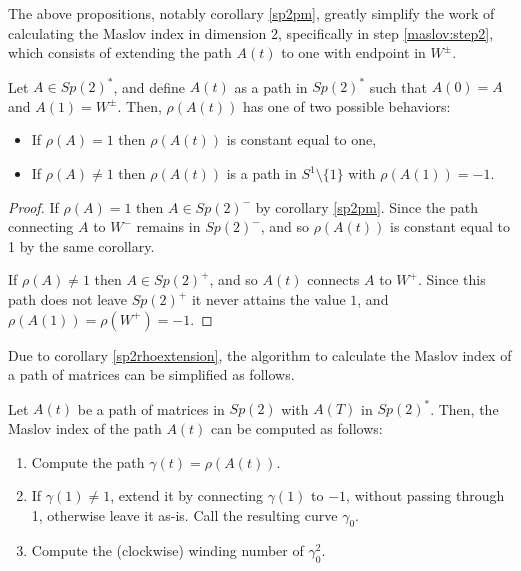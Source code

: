 The above propositions, notably corollary \ref{sp2pm}, greatly simplify the work of calculating the Maslov index in dimension 2, specifically in step \ref{maslov:step2}, which consists of extending the path $A(t)$ to one with endpoint in $W^\pm$.

\begin{corollary}\label{sp2rhoextension}
Let $A \in Sp(2)^*$, and define $A(t)$ as a path in $Sp(2)^*$ such that $A(0) = A$ and $A(1) = W^\pm$. Then, $\rho(A(t))$ has one of two possible behaviors:
\begin{itemize}
\item If $\rho(A) = 1$ then $\rho(A(t))$ is constant equal to one,
\item If $\rho(A) \neq 1$ then $\rho(A(t))$ is a path in $S^1 \setminus \{1\}$ with $\rho(A(1)) = -1$.
\end{itemize}
\end{corollary}

\begin{proof}
If $\rho(A) = 1$ then $A \in Sp(2)^-$ by corollary \ref{sp2pm}. Since the path connecting $A$ to $W^-$ remains in $Sp(2)^-$, and so $\rho(A(t))$ is constant equal to 1 by the same corollary.

If $\rho(A) \neq 1$ then $A \in Sp(2)^+$, and so $A(t)$ connects $A$ to $W^+$. Since this path does not leave $Sp(2)^+$ it never attains the value $1$, and $\rho(A(1)) = \rho(W^+) = -1$.
\end{proof}

Due to corollary \ref{sp2rhoextension}, the algorithm to calculate the Maslov index of a path of matrices can be simplified as follows.

\begin{prop}
Let $A(t)$ be a path of matrices in $Sp(2)$ with $A(T)$ in $Sp(2)^*$. Then, the Maslov index of the path $A(t)$ can be computed as follows:

\begin{enumerate}[algorithm]
\item Compute the path $\gamma(t) = \rho(A(t))$. 
\item If $\gamma(1) \neq 1$, extend it by connecting $\gamma(1)$ to $-1$, without passing through 1, otherwise leave it as-is. Call the resulting curve $\gamma_0$.
\item Compute the (clockwise) winding number of $\gamma_0^2$.
\end{enumerate}
\end{prop}


